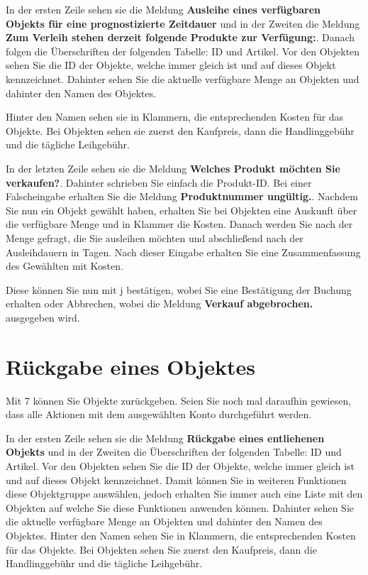 ﻿\documentclass[a4paper,12pt,titlepage]{article}
\newcommand\enquote[1]{{\ttfamily \bfseries #1}}
\begin{document}
In der ersten Zeile sehen sie die Meldung \enquote{Ausleihe eines verfügbaren Objekts für eine prognostizierte Zeitdauer}
 und in der Zweiten die Meldung \enquote{Zum Verleih stehen derzeit folgende Produkte zur Verfügung:}.
Danach folgen die Überschriften der folgenden Tabelle: ID und Artikel.
Vor den Objekten sehen Sie die ID der Objekte, welche immer gleich ist und auf dieses Objekt kennzeichnet. 
Dahinter sehen Sie die aktuelle verfügbare Menge an Objekten und dahinter den Namen des Objektes.

Hinter den Namen sehen sie in Klammern, die entsprechenden Kosten für das Objekte.
Bei Objekten sehen sie zuerst den Kaufpreis, dann die Handlinggebühr und die tägliche Leihgebühr.

In der letzten Zeile sehen sie die Meldung \enquote{Welches Produkt möchten Sie verkaufen?}.
Dahinter schrieben Sie einfach die Produkt-ID.
Bei einer Falscheingabe erhalten Sie die Meldung \enquote{Produktnummer ungültig.}.
Nachdem Sie nun ein Objekt gewählt haben,
 erhalten Sie bei Objekten eine Auskunft über die verfügbare Menge und in Klammer die Kosten.
Danach werden Sie nach der Menge gefragt, die Sie ausleihen möchten und abschließend nach der Ausleihdauern in Tagen.
Nach dieser Eingabe erhalten Sie eine Zusammenfassung des Gewählten mit Kosten.

Diese können Sie nun mit j bestätigen, wobei Sie eine Bestätigung der Buchung erhalten oder Abbrechen,
 wobei die Meldung \enquote{Verkauf abgebrochen.} ausgegeben wird.

\section{Rückgabe eines Objektes}
Mit 7 können Sie Objekte zurückgeben.
Seien Sie noch mal daraufhin gewiesen, dass alle Aktionen mit dem ausgewählten Konto durchgeführt werden.

In der ersten Zeile sehen sie die Meldung \enquote{Rückgabe eines entliehenen Objekts}
 und in der Zweiten die Überschriften der folgenden Tabelle: ID und Artikel.
Vor den Objekten sehen Sie die ID der Objekte, welche immer gleich ist und auf dieses Objekt kennzeichnet.
Damit können Sie in weiteren Funktionen diese Objektgruppe auswählen,
 jedoch erhalten Sie immer auch eine Liste mit den Objekten auf welche Sie diese Funktionen anwenden können.
Dahinter sehen Sie die aktuelle verfügbare Menge an Objekten und dahinter den Namen des Objektes.
Hinter den Namen sehen Sie in Klammern, die entsprechenden Kosten für das Objekte.
Bei Objekten sehen Sie zuerst den Kaufpreis, dann die Handlinggebühr und die tägliche Leihgebühr.
\end{document}
